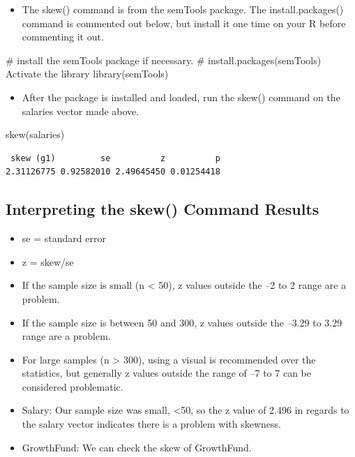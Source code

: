 \documentclass[
  letterpaper,
  DIV=11,
  numbers=noendperiod]{scrreprt}
\newenvironment{Shaded}{\begin{snugshade}}{\end{snugshade}}
\newcommand{\CommentTok}[1]{\textcolor[rgb]{0.37,0.37,0.37}{#1}}
\newcommand{\FunctionTok}[1]{\textcolor[rgb]{0.28,0.35,0.67}{#1}}
\newcommand{\NormalTok}[1]{\textcolor[rgb]{0.00,0.23,0.31}{#1}}
\providecommand{\tightlist}{%
  \setlength{\itemsep}{0pt}\setlength{\parskip}{0pt}}\usepackage{longtable,booktabs,array}
\begin{document}
\begin{itemize}
\tightlist
\item
  The skew() command is from the semTools package. The
  install.packages() command is commented out below, but install it one
  time on your R before commenting it out.
\end{itemize}

\begin{Shaded}
\begin{Highlighting}[]
\CommentTok{\# install the semTools package if necessary.}
\CommentTok{\# install.packages(\textquotesingle{}semTools\textquotesingle{}) Activate the library}
\FunctionTok{library}\NormalTok{(semTools)}
\end{Highlighting}
\end{Shaded}

\begin{itemize}
\tightlist
\item
  After the package is installed and loaded, run the skew() command on
  the salaries vector made above.
\end{itemize}

\begin{Shaded}
\begin{Highlighting}[]
\FunctionTok{skew}\NormalTok{(salaries)}
\end{Highlighting}
\end{Shaded}

\begin{verbatim}
 skew (g1)         se          z          p 
2.31126775 0.92582010 2.49645450 0.01254418 
\end{verbatim}

\subsection{Interpreting the skew() Command
Results}\label{interpreting-the-skew-command-results}

\begin{itemize}
\item
  se = standard error
\item
  z = skew/se
\item
  If the sample size is small (n \textless{} 50), z values outside the
  --2 to 2 range are a problem.
\item
  If the sample size is between 50 and 300, z values outside the --3.29
  to 3.29 range are a problem.
\item
  For large samples (n \textgreater{} 300), using a visual is
  recommended over the statistics, but generally z values outside the
  range of --7 to 7 can be considered problematic.
\item
  Salary: Our sample size was small, \textless50, so the z value of
  2.496 in regards to the salary vector indicates there is a problem
  with skewness.
\item
  GrowthFund: We can check the skew of GrowthFund.
\end{itemize}
\end{document}
